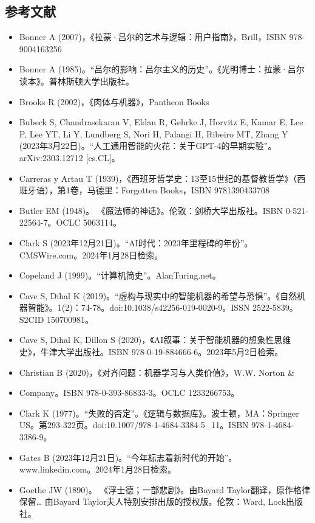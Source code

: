 \subsection{参考文献} 
\begin{itemize}
\item Bonner A (2007)，《拉蒙·吕尔的艺术与逻辑：用户指南》，Brill，ISBN 978-9004163256  
\item Bonner A (1985)。“吕尔的影响：吕尔主义的历史”。《光明博士：拉蒙·吕尔读本》。普林斯顿大学出版社。  
\item Brooks R (2002)，《肉体与机器》，Pantheon Books  
\item Bubeck S, Chandrasekaran V, Eldan R, Gehrke J, Horvitz E, Kamar E, Lee P, Lee YT, Li Y, Lundberg S, Nori H, Palangi H, Ribeiro MT, Zhang Y (2023年3月22日)。“人工通用智能的火花：关于GPT-4的早期实验”。arXiv:2303.12712 [cs.CL]。  
\item Carreras y Artau T (1939)，《西班牙哲学史：13至15世纪的基督教哲学》（西班牙语），第1卷，马德里：Forgotten Books，ISBN 9781390433708  
\item Butler EM (1948)。 《魔法师的神话》。伦敦：剑桥大学出版社。ISBN 0-521-22564-7。OCLC 5063114。  
\item Clark S (2023年12月21日)。“AI时代：2023年里程碑的年份”。CMSWire.com。2024年1月28日检索。  
\item Copeland J (1999)。“计算机简史”。AlanTuring.net。  
\item Cave S, Dihal K (2019)。“虚构与现实中的智能机器的希望与恐惧”。《自然机器智能》。1(2)：74-78。doi:10.1038/s42256-019-0020-9。ISSN 2522-5839。S2CID 150700981。  
\item Cave S, Dihal K, Dillon S (2020)，《AI叙事：关于智能机器的想象性思维史》，牛津大学出版社。ISBN 978-0-19-884666-6。2023年5月2日检索。  
\item Christian B (2020)，《对齐问题：机器学习与人类价值》，W.W. Norton & \item Company。ISBN 978-0-393-86833-3。OCLC 1233266753。  
\item Clark K (1977)。“失败的否定”。《逻辑与数据库》。波士顿，MA：Springer US。第293-322页。doi:10.1007/978-1-4684-3384-5_11。ISBN 978-1-4684-3386-9。  
\item Gates B (2023年12月21日)。“今年标志着新时代的开始”。www.linkedin.com。2024年1月28日检索。  
\item Goethe JW (1890)。 《浮士德；一部悲剧》。由Bayard Taylor翻译，原作格律保留… 由Bayard Taylor夫人特别安排出版的授权版。伦敦：Ward, Lock出版社。


\end{itemize}
